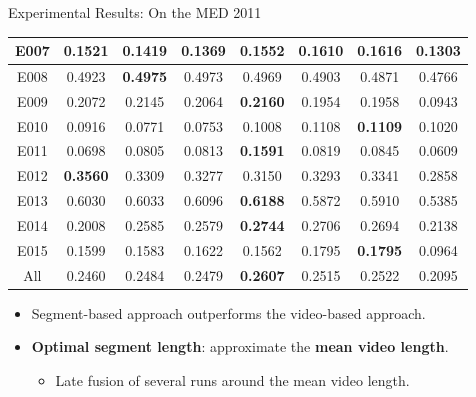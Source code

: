 \documentclass{beamer}
\begin{document}
\begin{frame}[t]{Experimental Results: On the MED 2011}
\begin{table}
\begin{tabular}{|c|c|c|c|c|c|c|c|}
		E007  & \multicolumn{1}{|c|}{0.1521} & 0.1419 & \multicolumn{1}{|c|}{0.1369} & 0.1552 & 0.1610 & \multicolumn{1}{|c|}{\textbf{0.1616}} & 0.1303 \\	\midrule
		E008  & \multicolumn{1}{|c|}{0.4923} & \textbf{0.4975} & \multicolumn{1}{|c|}{0.4973} & 0.4969 & 0.4903 & \multicolumn{1}{|c|}{0.4871} & 0.4766 \\	\midrule
		E009  & \multicolumn{1}{|c|}{0.2072} & 0.2145 & \multicolumn{1}{|c|}{0.2064} & \textbf{0.2160} & 0.1954 & \multicolumn{1}{|c|}{0.1958} & 0.0943 \\	\midrule
		E010  & \multicolumn{1}{|c|}{0.0916} & 0.0771 & \multicolumn{1}{|c|}{0.0753} & 0.1008 & 0.1108 & \multicolumn{1}{|c|}{\textbf{0.1109}} & 0.1020 \\	\midrule
		E011  & \multicolumn{1}{|c|}{0.0698} & 0.0805 & \multicolumn{1}{|c|}{0.0813} & \textbf{0.1591} & 0.0819 & \multicolumn{1}{|c|}{0.0845} & 0.0609 \\	\midrule
		E012  & \multicolumn{1}{|c|}{\textbf{0.3560}} & 0.3309 & \multicolumn{1}{|c|}{0.3277} & 0.3150 & 0.3293 & \multicolumn{1}{|c|}{0.3341} & 0.2858 \\	\midrule
		E013  & \multicolumn{1}{|c|}{0.6030} & 0.6033 & \multicolumn{1}{|c|}{0.6096} & \textbf{0.6188} & 0.5872 & \multicolumn{1}{|c|}{0.5910} & 0.5385 \\	\midrule
		E014  & \multicolumn{1}{|c|}{0.2008} & 0.2585 & \multicolumn{1}{|c|}{0.2579} & \textbf{0.2744} & 0.2706 & \multicolumn{1}{|c|}{0.2694} & 0.2138 \\	\midrule
		E015  & \multicolumn{1}{|c|}{0.1599} & 0.1583 & \multicolumn{1}{|c|}{0.1622} & 0.1562 & 0.1795 & \multicolumn{1}{|c|}{\textbf{0.1795}} & 0.0964 \\ 	\midrule
		All   & \multicolumn{1}{|c|}{0.2460} & 0.2484 & \multicolumn{1}{|c|}{0.2479} & \textbf{0.2607} & 0.2515 & \multicolumn{1}{|c|}{0.2522} & 0.2095 \\	\bottomrule
	\end{tabular}%
\end{table}
\begin{itemize}
	\item Segment-based approach outperforms the video-based approach.
	\item \textbf{Optimal segment length}: approximate the \textbf{mean video length}. 
	\begin{itemize}
		\item Late fusion of several runs around the mean video length.
	\end{itemize}	
\end{itemize}	

\end{frame}
\end{document}
